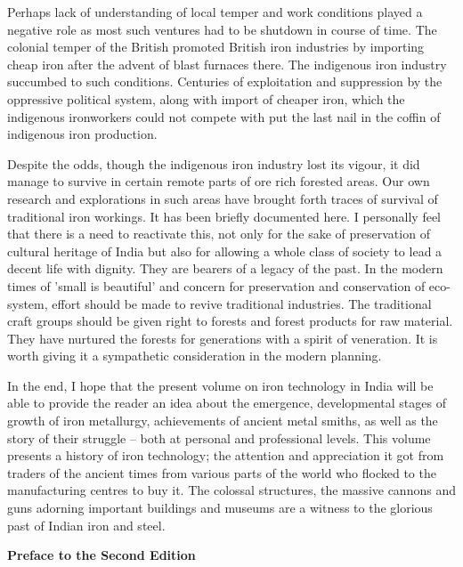 Perhaps lack of understanding of local temper and work conditions played a negative role as most such ventures had to be shutdown in course of time. The colonial temper of the British promoted British iron industries by importing cheap iron after the advent of blast furnaces there. The indigenous iron industry succumbed to such conditions. Centuries of exploitation and suppression by the oppressive political system, along with import of cheaper iron, which the indigenous ironworkers could not compete with put the last nail in the coffin of indigenous iron production.

Despite the odds, though the indigenous iron industry lost its vigour, it did manage to survive in certain remote parts of ore rich forested areas. Our own research and explorations in such areas have brought forth traces of survival of traditional iron workings. It has been briefly documented here. I personally feel that there is a need to reactivate this, not only for the sake of preservation of cultural heritage of India but also for allowing a whole class of society to lead a decent life with dignity. They are bearers of a legacy of the past. In the modern times of 'small is beautiful' and concern for preservation and conservation of eco-system, effort should be made to revive traditional industries. The traditional craft groups should be given right to forests and forest products for raw material. They have nurtured the forests for generations with a spirit of veneration. It is worth giving it a sympathetic consideration in the modern planning. 


In the end, I hope that the present volume on iron technology in India will be able to provide the reader an idea about the emergence, developmental stages of growth of iron metallurgy, achievements of ancient metal smiths, as well as the story of their struggle – both at personal and professional levels. This volume presents a history of iron technology; the attention and appreciation it got from traders of the ancient times from various parts of the world who flocked to the manufacturing centres to buy it. The colossal structures, the massive cannons and guns adorning important buildings and museums are a witness to the glorious past of Indian iron and steel. 

{\large{\textbf{Preface to the Second Edition}}}


